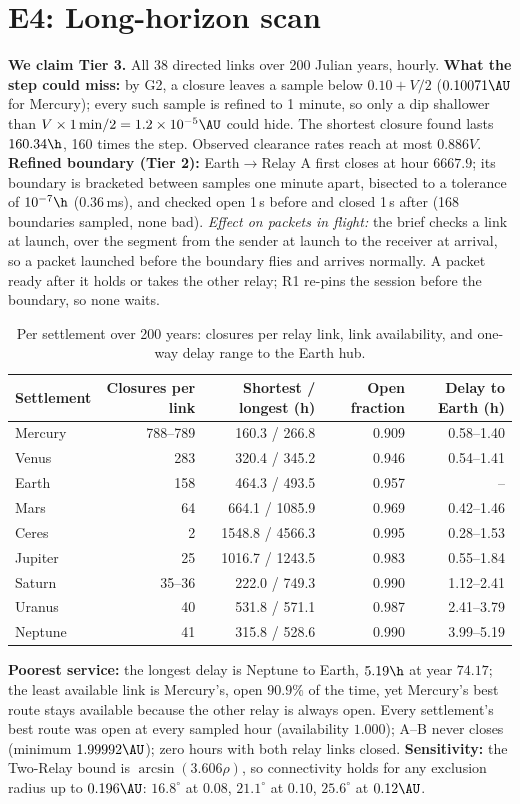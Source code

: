 \section{E4: Long-horizon scan}\label{app:e4}
\textbf{We claim Tier 3.} All 38 directed links over 200 Julian years, hourly. \textbf{What the step could miss:} by G2, a closure leaves a sample below $0.10+V/2$ ($0.10071\AU$ for Mercury); every such sample is refined to 1 minute, so only a dip shallower than $V\times1\,\mathrm{min}/2 = 1.2\times10^{-5}\AU$ could hide. The shortest closure found lasts $160.34\h$, 160 times the step. Observed clearance rates reach at most $0.886V$. \textbf{Refined boundary (Tier 2):} Earth$\to$Relay A first closes at hour $6667.9$; its boundary is bracketed between samples one minute apart, bisected to a tolerance of $10^{-7}\h$ (0.36\,ms), and checked open 1\,s before and closed 1\,s after (168 boundaries sampled, none bad). \emph{Effect on packets in flight:} the brief checks a link at launch, over the segment from the sender at launch to the receiver at arrival, so a packet launched before the boundary flies and arrives normally. A packet ready after it holds or takes the other relay; R1 re-pins the session before the boundary, so none waits.
\begin{table}[H]
\centering
\caption{Per settlement over 200 years: closures per relay link, link availability, and one-way delay range to the Earth hub.}
\small
\begin{tabular}{@{}lrrrr@{}}
\toprule
Settlement & Closures per link & Shortest / longest (h) & Open fraction & Delay to Earth (h) \\
\midrule
Mercury & 788--789 & 160.3 / 266.8 & 0.909 & 0.58--1.40 \\
Venus & 283 & 320.4 / 345.2 & 0.946 & 0.54--1.41 \\
Earth & 158 & 464.3 / 493.5 & 0.957 & -- \\
Mars & 64 & 664.1 / 1085.9 & 0.969 & 0.42--1.46 \\
Ceres & 2 & 1548.8 / 4566.3 & 0.995 & 0.28--1.53 \\
Jupiter & 25 & 1016.7 / 1243.5 & 0.983 & 0.55--1.84 \\
Saturn & 35--36 & 222.0 / 749.3 & 0.990 & 1.12--2.41 \\
Uranus & 40 & 531.8 / 571.1 & 0.987 & 2.41--3.79 \\
Neptune & 41 & 315.8 / 528.6 & 0.990 & 3.99--5.19 \\
\bottomrule
\end{tabular}
\end{table}
\textbf{Poorest service:} the longest delay is Neptune to Earth, $5.19\h$ at year $74.17$; the least available link is Mercury's, open $90.9\%$ of the time, yet Mercury's best route stays available because the other relay is always open. Every settlement's best route was open at every sampled hour (availability $1.000$); A--B never closes (minimum $1.99992\AU$); zero hours with both relay links closed. \textbf{Sensitivity:} the Two-Relay bound is $\arcsin(3.606\rho)$, so connectivity holds for any exclusion radius up to $0.196\AU$: $16.8^\circ$ at $0.08$, $21.1^\circ$ at $0.10$, $25.6^\circ$ at $0.12\AU$.

